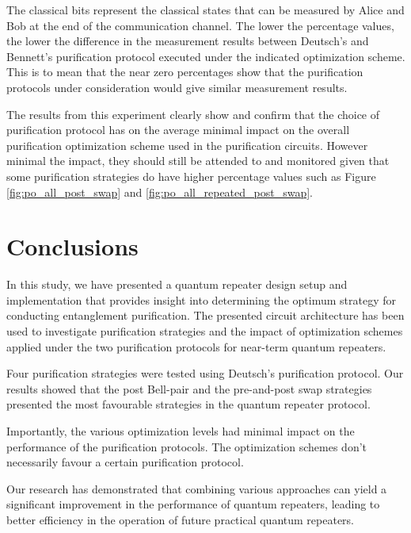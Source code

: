 \documentclass[11pt]{article}
\begin{document}
The classical bits represent the classical states that can be measured by Alice and Bob at the end of the communication channel. The lower the percentage values, the lower the difference in the measurement results between Deutsch's and Bennett's purification protocol executed under the indicated optimization scheme. This is to mean that the near zero percentages show that the purification protocols under consideration would give similar measurement results.

The results from this experiment clearly show and confirm that the choice of purification protocol has on the average minimal impact on the overall purification optimization scheme used in the purification circuits. However minimal the impact, they should still be attended to and monitored given that some purification strategies do have higher percentage values such as Figure \ref{fig:po_all_post_swap} and \ref{fig:po_all_repeated_post_swap}.
\section{Conclusions}
In this study, we have presented a quantum repeater design setup and implementation that provides insight into determining the optimum strategy for conducting entanglement purification. The presented circuit architecture has been used to investigate purification strategies and the impact of optimization schemes applied under the two purification protocols for near-term quantum repeaters.

Four purification strategies were tested using Deutsch's purification protocol. Our results showed that the post Bell-pair and the pre-and-post swap strategies presented the most favourable strategies in the quantum repeater protocol.

Importantly, the various optimization levels had minimal impact on the performance of the purification protocols. The optimization schemes don't necessarily favour a certain purification protocol.

Our research has demonstrated that combining various approaches can yield a significant improvement in the performance of quantum repeaters, leading to better efficiency in the operation of future practical quantum repeaters.
\end{document}
